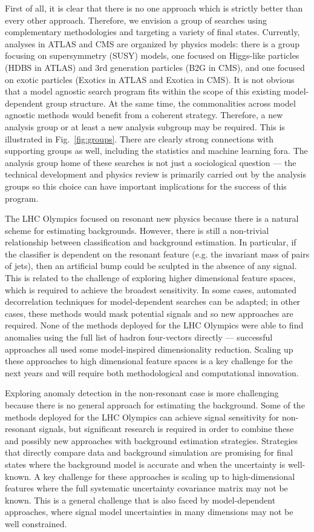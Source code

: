 \documentclass[a4paper,11pt]{article}
\begin{document}
First of all, it is clear that there is no one approach which is strictly better than every other approach.  Therefore, we envision a group of searches using complementary methodologies and targeting a variety of final states.  Currently, analyses in ATLAS and CMS are organized by physics models: there is a group focusing on supersymmetry (SUSY) models, one focused on Higgs-like particles (HDBS in ATLAS) and 3rd generation particles (B2G in CMS), and one focused on exotic particles (Exotics in ATLAS and Exotica in CMS).  It is not obvious that a model agnostic search program fits within the scope of this existing model-dependent group structure.  At the same time, the commonalities across model agnostic methods would benefit from a coherent strategy.  Therefore, a new analysis group or at least a new analysis subgroup may be required.  This is illustrated in Fig.~\ref{fig:groups}.  There are clearly strong connections with supporting groups as well, including the statistics and machine learning fora.  The analysis group home of these searches is not just a sociological question --- the technical development and physics review is primarily carried out by the analysis groups so this choice can have important implications for the success of this program.

The LHC Olympics focused on resonant new physics because there is a natural scheme for estimating backgrounds.  However, there is still a non-trivial relationship between classification and background estimation.  In particular, if the classifier is dependent on the resonant feature (e.g. the invariant mass of pairs of jets), then an artificial bump could be sculpted in the absence of any signal.  This is related to the challenge of exploring higher dimensional feature spaces, which is required to achieve the broadest sensitivity.  In some cases, automated decorrelation techniques for model-dependent searches can be adapted; in other cases, these methods would mask potential signals and so new approaches are required.  None of the methods deployed for the LHC Olympics were able to find anomalies using the full list of hadron four-vectors directly --- successful approaches all used some model-inspired dimensionality reduction.  Scaling up these approaches to high dimensional feature spaces is a key challenge for the next years and will require both methodological and computational innovation.

Exploring anomaly detection in the non-resonant case is more challenging because there is no general approach for estimating the background.  Some of the methods deployed for the LHC Olympics can achieve signal sensitivity for non-resonant signals, but significant research is required in order to combine these and possibly new approaches with background estimation strategies.  Strategies that directly compare data and background simulation are promising for final states where the background model is accurate and when the uncertainty is well-known.  A key challenge for these approaches is scaling up to high-dimensional features where the full systematic uncertainty covariance matrix may not be known.  This is a general challenge that is also faced by model-dependent approaches, where signal model uncertainties in many dimensions may not be well constrained.
\end{document}
